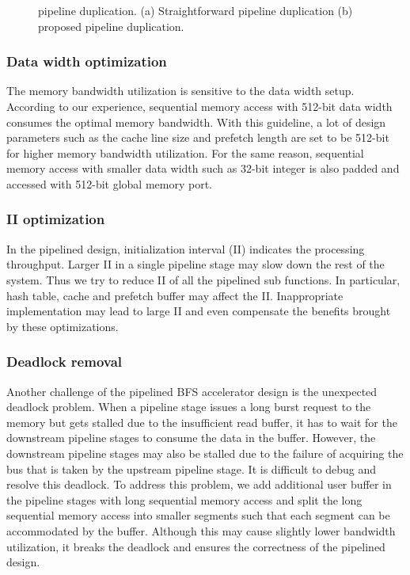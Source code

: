 \begin{figure}
    \caption{pipeline duplication. (a) Straightforward pipeline duplication 
    (b) proposed pipeline duplication.}
\label{fig:duplicate-pipeline}
\end{figure}


\subsubsection{Data width optimization}
The memory bandwidth utilization is sensitive to the data width setup. 
According to our experience, sequential memory access 
with 512-bit data width consumes the optimal memory bandwidth. With this guideline, 
a lot of design parameters such as the cache line size and prefetch length are 
set to be 512-bit for higher memory bandwidth utilization. For the same reason, sequential 
memory access with smaller data width such as 32-bit integer is also 
padded and accessed with 512-bit global memory port.

\subsubsection{II optimization}
In the pipelined design, initialization interval (II) indicates the 
processing throughput. Larger II in a single pipeline stage 
may slow down the rest of the system. Thus we try to reduce II of all 
the pipelined sub functions. In particular, hash table, cache and prefetch 
buffer may affect the II. Inappropriate implementation may lead to 
large II and even compensate the benefits brought by these optimizations. 

\subsubsection{Deadlock removal}
Another challenge of the pipelined BFS accelerator design is the 
unexpected deadlock problem. 
When a pipeline stage issues a long burst request to the memory 
but gets stalled due to the insufficient read buffer, it has to 
wait for the downstream pipeline stages to consume the data in the buffer. 
However, the downstream pipeline stages may also be stalled due to 
the failure of acquiring the bus that is taken by the upstream pipeline stage.
It is difficult to debug and resolve this deadlock. To address this problem, we
add additional user buffer in the pipeline stages with long sequential 
memory access and split the long sequential memory access into smaller 
segments such that each segment can be accommodated by the buffer. 
Although this may cause slightly lower bandwidth utilization, it breaks the deadlock and 
ensures the correctness of the pipelined design.

